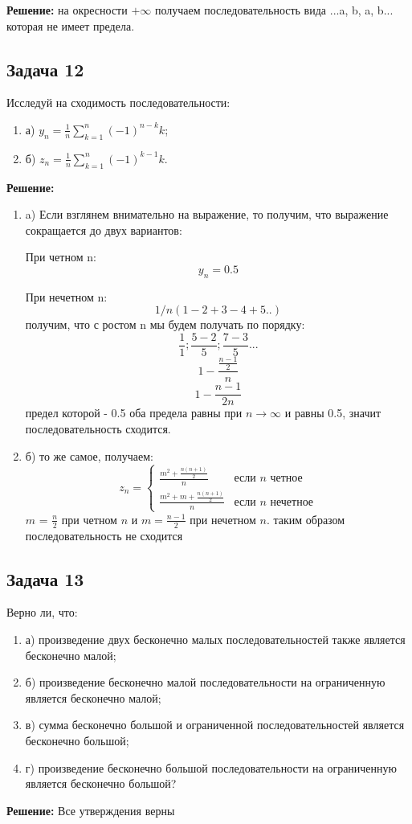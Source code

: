 \documentclass[a4paper,12pt]{article}
\begin{document}
\textbf{Решение: }
на окресности $+\infty $ получаем последовательность вида {...a, b, a, b...} которая не имеет предела.

\subsection{Задача 12}
Исследуй на сходимость последовательности:
\begin{enumerate}
    \item а) $y_n = \frac{1}{n} \sum_{k=1}^{n} (-1)^{n-k}k$;
    \item б) $z_n = \frac{1}{n} \sum_{k=1}^{n} (-1)^{k-1}k$.
\end{enumerate}
\textbf{Решение:}
\begin{enumerate}
    \item a)  Если взглянем внимательно на выражение, то получим, что выражение сокращается до двух вариантов:

    При четном n:
    \[
    y_n = 0.5
    \]
    
    
    При нечетном n:
    \[
    1/n(1-2+3-4+5..)
    \]
    получим, что с ростом n мы будем получать по порядку:
    \[
    \frac{1}{1};\frac{5-2}{5};\frac{7-3}{5}...
    \]
    \[
    1-\frac{\frac{n-1}{2}}{n}
    \]
    \[
    1-\frac{n-1}{2n}
    \] предел которой - 0.5
    оба предела равны при $n \to \infty$ и равны 0.5, значит последовательность сходится.

    \item б) 
    то же самое, получаем: 
    \[
    z_n = 
    \begin{cases} 
    \frac{m^2 + \frac{n(n+1)}{2}}{n} & \text{если } n \text{ четное} \\ 
    \frac{m^2 + m + \frac{n(n+1)}{2}}{n} & \text{если } n \text{ нечетное} 
    \end{cases}
    \]
    \( m \) = \( \frac{n}{2} \) при четном \( n \) и \( m = \frac{n-1}{2} \) при нечетном \( n \).
    таким образом последовательность не сходится

\end{enumerate}

\subsection{Задача 13}
Верно ли, что:
\begin{enumerate}
    \item а) произведение двух бесконечно малых последовательностей также является бесконечно малой;
    \item б) произведение бесконечно малой последовательности на ограниченную является бесконечно малой;
    \item в) сумма бесконечно большой и ограниченной последовательностей является бесконечно большой;
    \item г) произведение бесконечно большой последовательности на ограниченную является бесконечно большой?
\end{enumerate}
\textbf{Решение:} Все утверждения верны
\end{document}
